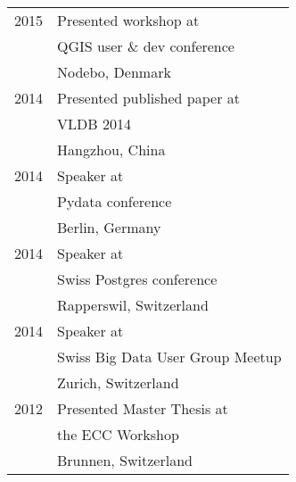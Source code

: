\documentclass[10pt]{article} %
\begin{document}
\begin{minipage}[t]{0.44\textwidth}
\begin{tabular}{rl}
\textsc{2015}
& Presented workshop at \\
& QGIS user \& dev conference \\
& \small Nodebo, Denmark \\
\textsc{2014}
& Presented published paper at \\
& VLDB 2014 \\
& \small Hangzhou, China \\
\textsc{2014}
& Speaker at \\
& Pydata conference \\
& \small Berlin, Germany \\
\textsc{2014}
& Speaker at \\
& Swiss Postgres conference \\
& \small Rapperswil, Switzerland \\
\textsc{2014}
& Speaker at \\
& Swiss Big Data User Group Meetup \\
& \small Zurich, Switzerland \\


\textsc{2012}
& Presented Master Thesis at \\
& the ECC Workshop \\
& \small Brunnen, Switzerland \\




\end{tabular}\\[10pt]


	
\end{minipage} %
\end{document}
